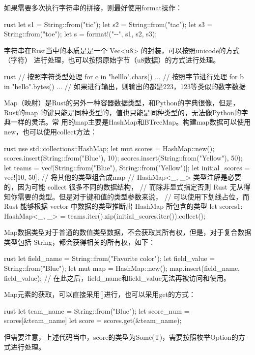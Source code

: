 如果需要多次执行字符串的拼接，则最好使用format操作：
\begin{code-block}{rust}
let s1 = String::from("tic");
let s2 = String::from("tac");
let s3 = String::from("toe");
let s = format!("{}-{}-{}", s1, s2, s3);
\end{code-block}

字符串在Rust当中的本质是是一个 Vec<u8> 的封装，可以按照unicode的方式（字符）
进行处理，也可以按照原始字节（u8数据）的方式进行处理。
\begin{code-block}{rust}
// 按照字符类型处理
for c in "helllo".chars() {
    ...
}
// 按照字节进行处理
for b in "hello".bytes() {
    ... // 如果进行输出，则输出的都是223，123等类似的数字数据
}
\end{code-block}

Map（映射）是Rust的另外一种容器数据类型，和Python的字典很像，但是，Rust的map
的键只能是同种类型的，值也只能是同种类型的，无法像Python的字典一样的灵活。常
用的map主要是HashMap和BTreeMap。构建map数据可以使用new，也可以使用collect方法：
\begin{code-block}{rust}
use std::collections::HashMap;
let mut scores = HashMap::new();
scores.insert(String::from("Blue"), 10);
scores.insert(String::from("Yellow"), 50);
let teams  = vec![String::from("Blue"), String::from("Yellow")];
let initial_scores = vec![10, 50];
// 将其他的类型组合成map
// HashMap<_, _> 类型注解是必要的，因为可能 collect 很多不同的数据结构，
// 而除非显式指定否则 Rust 无从得知你需要的类型。但是对于键和值的类型参数来说，
// 可以使用下划线占位，而 Rust 能够根据 vector 中数据的类型推断出 HashMap 所包含的类型
let scores1: HashMap<_, _> = teams.iter().zip(initial_scores.iter()).collect();
\end{code-block}

Map数据类型对于普通的数值类型数据，不会获取其所有权，但是，对于复合数据类型包括
String，都会获得相关的所有权，如下：
\begin{code-block}{rust}
let field_name = String::from("Favorite color");
let field_value = String::from("Blue");
let mut map = HashMap::new();
map.insert(field_name, field_value);
// 在此之后，field_name和field_value无法再被访问和使用。
\end{code-block}

Map元素的获取，可以直接采用[]进行，也可以采用get的方式：
\begin{code-block}{rust}
let team_name = String::from("Blue");
let score_num = scores[&team_name]
let score = scores.get(&team_name);
\end{code-block}
但需要注意，上述代码当中，score的类型为Some(T)，需要按照枚举Option的方式进行处理。

